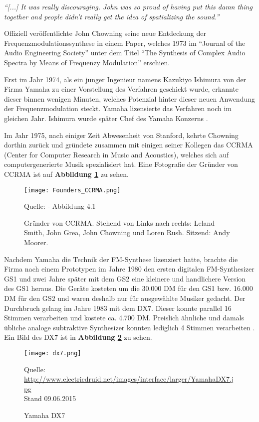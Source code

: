 \textit{``[...] It was really discouraging. John was so proud of having put this damn thing together and people didn't really get the idea of spatializing the sound.''}\cite[S. 43]{soundofinnovation}

Offiziell veröffentlichte John Chowning seine neue Entdeckung der Frequenzmodulationssynthese in einem Paper, welches 1973 im ``Journal of the Audio Engineering Society'' unter dem Titel ``The Synthesis of Complex Audio Spectra by Means of Frequenzy Modulation'' erschien.

Erst im Jahr 1974, als ein junger Ingenieur namens Kazukiyo Ishimura von der Firma Yamaha zu einer Vorstellung des Verfahren geschickt wurde, erkannte dieser binnen wenigen Minuten, welches Potenzial hinter dieser neuen Anwendung der Frequenzmodulation steckt. Yamaha lizensierte das Verfahren noch im gleichen Jahr. Ishimura wurde später Chef des Yamaha Konzerns \cite{fatherofdigitalmusik}.

Im Jahr 1975, nach einiger Zeit Abwesenheit von Stanford, kehrte Chowning dorthin zurück und gründete zusammen mit einigen seiner Kollegen das CCRMA (Center for Computer Research in Music and Acoustics), welches sich auf computergenerierte Musik spezialisiert hat.
Eine Fotografie der Gründer von CCRMA ist auf \textbf{Abbildung \ref{fig:foundersCCRMA}} zu sehen.

\begin{figure} [ht]
\centering
  \texttt{[image: Founders\_CCRMA.png]}
\caption{Gründer von CCRMA. Stehend von Links nach rechts: Leland Smith, John Grea, John Chowning und Loren Rush. Sitzend: Andy Moorer.}
\label{fig:foundersCCRMA}
Quelle: \cite[S. 52]{soundofinnovation} - Abbildung 4.1
\end{figure}

Nachdem Yamaha die Technik der FM-Synthese lizenziert hatte, brachte die Firma nach einem Prototypen im Jahre 1980 den ersten digitalen FM-Synthesizer GS1 und zwei Jahre später mit dem GS2 eine kleinere und handlichere Version des GS1 heraus. Die Geräte kosteten um die 30.000 DM für den GS1 bzw. 16.000 DM für den GS2 und waren deshalb nur für ausgewählte Musiker gedacht. Der Durchbruch gelang im Jahre 1983 mit dem DX7. Dieser konnte parallel 16 Stimmen verarbeiten und kostete ca. 4.700 DM. Preislich ähnliche und damals übliche analoge subtraktive Synthesizer konnten lediglich 4 Stimmen verarbeiten \cite{fmGS1}. Ein Bild des DX7 ist in \textbf{Abbildung \ref{fig:dx7}} zu sehen.

 \begin{figure} [ht]
\centering
  \texttt{[image: dx7.png]}
\caption{Yamaha DX7}
\label{fig:dx7}
Quelle: \url{http://www.electricdruid.net/images/interface/larger/YamahaDX7.jpg}
\\Stand 09.06.2015
\end{figure}

